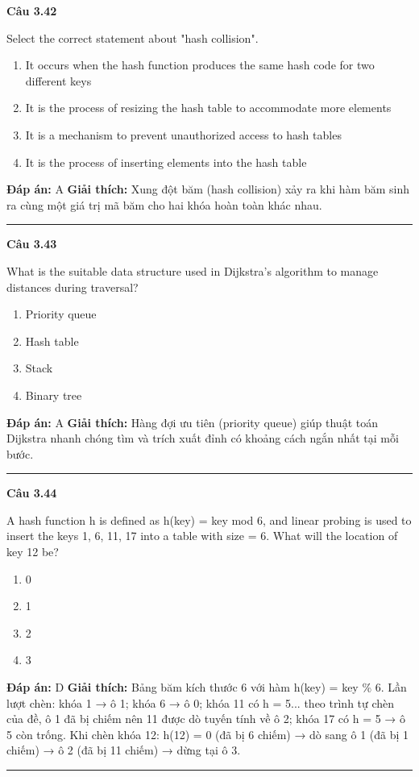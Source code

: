 \documentclass[11pt,a4paper]{article}
\newenvironment{question}[1]{%
  \par\vspace{1em}\noindent\textbf{\large Câu #1}\par\vspace{0.4em}
}{%
  \par\vspace{1em}\hrule\vspace{0.6em}
}
\newenvironment{choices}{%
  \begin{enumerate}[label=\textbf{\Alph*.},leftmargin=2.2em,itemsep=2pt,topsep=3pt]
}{%
  \end{enumerate}
}
\newcommand{\choice}{\item}
\begin{document}
\begin{question}{3.42}
Select the correct statement about "hash collision".
\begin{choices}
\choice It occurs when the hash function produces the same hash code for two different keys
\choice It is the process of resizing the hash table to accommodate more elements
\choice It is a mechanism to prevent unauthorized access to hash tables
\choice It is the process of inserting elements into the hash table
\end{choices}
\textbf{Đáp án:} A
\textbf{Giải thích:} Xung đột băm (hash collision) xảy ra khi hàm băm sinh ra cùng một giá trị mã băm cho hai khóa hoàn toàn khác nhau.
\end{question}

\begin{question}{3.43}
What is the suitable data structure used in Dijkstra's algorithm to manage distances during traversal?
\begin{choices}
\choice Priority queue
\choice Hash table
\choice Stack
\choice Binary tree
\end{choices}
\textbf{Đáp án:} A
\textbf{Giải thích:} Hàng đợi ưu tiên (priority queue) giúp thuật toán Dijkstra nhanh chóng tìm và trích xuất đỉnh có khoảng cách ngắn nhất tại mỗi bước.
\end{question}

\begin{question}{3.44}
A hash function h is defined as h(key) = key mod 6, and linear probing is used to insert the keys 1, 6, 11, 17 into a table with size = 6. What will the location of key 12 be?
\begin{choices}
\choice 0
\choice 1
\choice 2
\choice 3
\end{choices}
\textbf{Đáp án:} D
\textbf{Giải thích:} Bảng băm kích thước 6 với hàm h(key) = key \% 6. Lần lượt chèn: khóa 1 → ô 1; khóa 6 → ô 0; khóa 11 có h = 5... theo trình tự chèn của đề, ô 1 đã bị chiếm nên 11 được dò tuyến tính về ô 2; khóa 17 có h = 5 → ô 5 còn trống. Khi chèn khóa 12: h(12) = 0 (đã bị 6 chiếm) → dò sang ô 1 (đã bị 1 chiếm) → ô 2 (đã bị 11 chiếm) → dừng tại ô 3.
\end{question}
\end{document}
